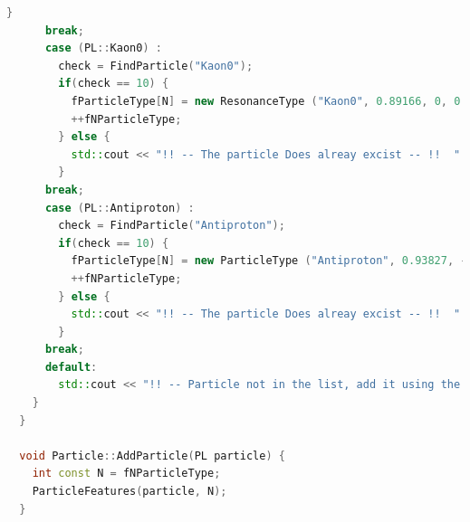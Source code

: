 \documentclass[a4paper, 11pt]{article}
\begin{document}
\begin{lstlisting}[language=c++, style=code]
        }
      break;
      case (PL::Kaon0) :
        check = FindParticle("Kaon0");
        if(check == 10) {
          fParticleType[N] = new ResonanceType ("Kaon0", 0.89166, 0, 0.05);
          ++fNParticleType;
        } else {
          std::cout << "!! -- The particle Does alreay excist -- !!  " << '\n';
        }
      break;
      case (PL::Antiproton) :
        check = FindParticle("Antiproton");
        if(check == 10) {
          fParticleType[N] = new ParticleType ("Antiproton", 0.93827, -1);
          ++fNParticleType;
        } else {
          std::cout << "!! -- The particle Does alreay excist -- !!  " << '\n';
        }
      break;
      default:
        std::cout << "!! -- Particle not in the list, add it using the standard AddParticle -- !!" << '\n';
    }
  }

  void Particle::AddParticle(PL particle) {
    int const N = fNParticleType;
    ParticleFeatures(particle, N);
  }
        \end{lstlisting}
\end{document}
